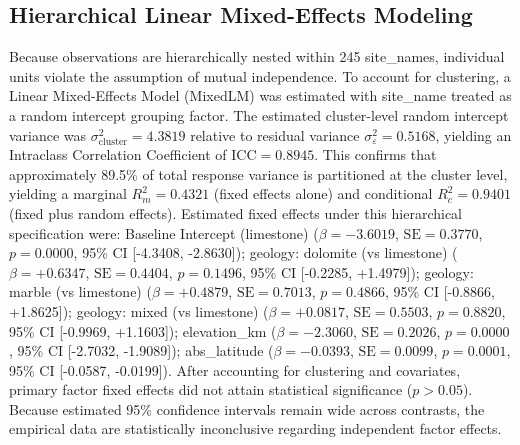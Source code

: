 \documentclass[sn-basic,Numbered]{sn-jnl}%
\begin{document}
\subsection{Hierarchical Linear Mixed-Effects Modeling}
Because observations are hierarchically nested within 245 site\_names, individual units violate the assumption of mutual independence. To account for clustering, a Linear Mixed-Effects Model (MixedLM) was estimated with site\_name treated as a random intercept grouping factor. The estimated cluster-level random intercept variance was $\sigma^2_{\text{cluster}} = 4.3819$ relative to residual variance $\sigma^2_\varepsilon = 0.5168$, yielding an Intraclass Correlation Coefficient of $\text{ICC} = 0.8945$. This confirms that approximately 89.5\% of total response variance is partitioned at the cluster level, yielding a marginal $R^2_m = 0.4321$ (fixed effects alone) and conditional $R^2_c = 0.9401$ (fixed plus random effects). Estimated fixed effects under this hierarchical specification were: Baseline Intercept (limestone) ($\beta = -3.6019$, $\text{SE} = 0.3770$, $p = 0.0000$, 95\% CI [-4.3408, -2.8630]); geology: dolomite (vs limestone) ($\beta = +0.6347$, $\text{SE} = 0.4404$, $p = 0.1496$, 95\% CI [-0.2285, +1.4979]); geology: marble (vs limestone) ($\beta = +0.4879$, $\text{SE} = 0.7013$, $p = 0.4866$, 95\% CI [-0.8866, +1.8625]); geology: mixed (vs limestone) ($\beta = +0.0817$, $\text{SE} = 0.5503$, $p = 0.8820$, 95\% CI [-0.9969, +1.1603]); elevation\_km ($\beta = -2.3060$, $\text{SE} = 0.2026$, $p = 0.0000$, 95\% CI [-2.7032, -1.9089]); abs\_latitude ($\beta = -0.0393$, $\text{SE} = 0.0099$, $p = 0.0001$, 95\% CI [-0.0587, -0.0199]). After accounting for clustering and covariates, primary factor fixed effects did not attain statistical significance ($p > 0.05$). Because estimated 95\% confidence intervals remain wide across contrasts, the empirical data are statistically inconclusive regarding independent factor effects.
\end{document}
